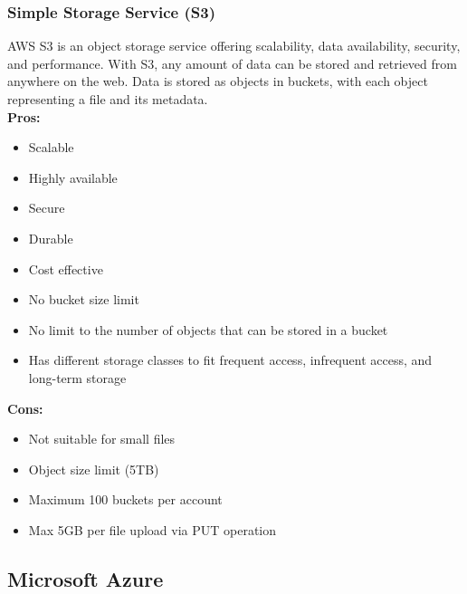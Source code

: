        \subsubsection{Simple Storage Service (S3)} 
        \label{aws:s3}
        AWS S3 is an object storage service offering scalability, data availability, security, and performance.
        With S3, any amount of data can be stored and retrieved from anywhere on the web. 
        Data is stored as objects in buckets, with each object representing a file and its metadata.\\
        \textbf{Pros:}
        \begin{itemize}
            \item Scalable
            \item Highly available
            \item Secure
            \item Durable
            \item Cost effective
            \item No bucket size limit
            \item No limit to the number of objects that can be stored in a bucket
            \item Has different storage classes to fit frequent access, infrequent access, and long-term storage
        \end{itemize}
        \textbf{Cons:}
        \begin{itemize}
            \item Not suitable for small files
            \item Object size limit (5TB)
            \item Maximum 100 buckets per account
            \item Max 5GB per file upload via PUT operation
        \end{itemize}


    \subsection{Microsoft Azure}
    
